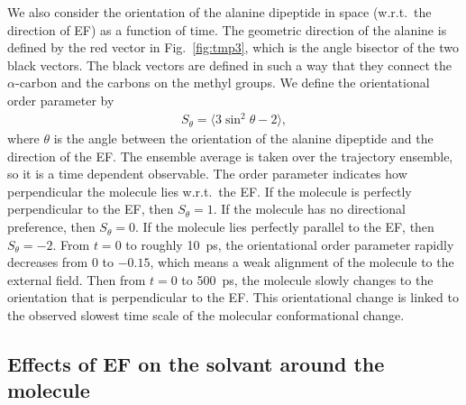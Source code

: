 \documentclass[a4paper,preprint,unsortedaddress,onecolumn]{revtex4-1}
\begin{document}
We also consider the orientation of the alanine dipeptide in space (w.r.t.~the direction of EF) as a function
of time.
The geometric direction of the alanine is defined by the red vector in
Fig.~\ref{fig:tmp3}, which is the angle bisector of the two black vectors.
The black vectors are defined in such a way that they connect the $\alpha$-carbon and the carbons
on the methyl groups. We define the orientational order parameter by
\begin{align}
  S_\theta = \langle 3\sin^2\theta - 2\rangle,
\end{align}
where $\theta$ is the angle between the orientation of the alanine dipeptide
and the direction of the EF.
The ensemble average is taken over the trajectory ensemble, so it is
a time dependent observable.
The order parameter
indicates how perpendicular the molecule lies w.r.t.~the EF.
If the molecule is perfectly perpendicular to the EF, then $S_\theta = 1$.
If the molecule has no directional
preference, then $S_\theta = 0$.
If the molecule lies perfectly parallel to the EF, then $S_\theta = -2$.
From $t=0$ to roughly 10~ps, the orientational order parameter rapidly
decreases from 0 to $-0.15$, which means a weak alignment of the molecule to the external field.
Then from $t=0$ to 500~ps, the molecule slowly changes to the orientation
that is perpendicular to the EF.
This orientational change is linked to the observed slowest
time scale of the molecular conformational change.


\subsection{Effects of EF on the solvant around the molecule}
\end{document}
